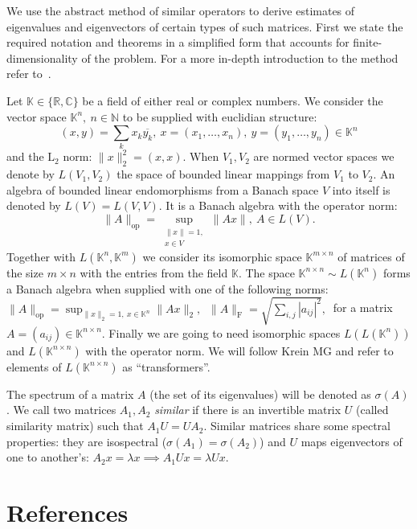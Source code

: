\documentclass[a4paper]{jpconf}
\begin{document}
We use the abstract method of similar operators
    to derive estimates of eigenvalues and eigenvectors
    of certain types of such matrices.
First we state the required notation and theorems
    in a simplified form that accounts for finite-dimensionality
    of the problem.
For a more in-depth introduction to the method
    refer to~\cite{baskakov1983methods,baskakov2014memory,baskakov2017method,baskakov2013completeness}.

Let \( \mathbb{K}\in \{ \mathbb{R}, \mathbb{C} \} \)
    be a field of either real or complex numbers.
We consider the vector space \( \mathbb{K}^n,\ n\in \mathbb{N} \)
    to be supplied with euclidian structure:
    \[
        (x, y){=}\sum_k x_k\overline{y_k},
        \ x{=}(x_1,\ldots, x_n),
        \ y=(y_1,\ldots, y_n)
        \in \mathbb{K}^n
        \]
    and the \( \mathrm{L}_2 \) norm:
    \(
        \|x\|_2^2{=}(x,x).
        \)
When \( V_1, V_2 \) are normed vector spaces
    we denote by \( L(V_1, V_2) \)
    the space of bounded linear mappings
    from \( V_1 \) to \( V_2 \).
An algebra of bounded linear endomorphisms
    from a Banach space \( V \)
    into itself
    is denoted by \( L(V) = L(V, V) \).
It is a Banach algebra with the operator norm:
    \[
        \|A\|_{\mathrm{op}} =
        \sup_{\substack{\|x\|=1,\\ x\in V}} \|A x\|,\ A\in L(V).
        \]
Together with \( L(\mathbb{K}^n, \mathbb{K}^m) \)
    we consider its isomorphic space \( \mathbb{K}^{m{\times}n} \)
    of matrices of the size \( m{\times}n \)
    with the entries from the field \( \mathbb{K} \).
The space \( \mathbb{K}^{n{\times}n}\sim L(\mathbb{K}^n) \)
    forms a Banach algebra
    when supplied with one of the following norms:
    \( \|A\|_{\mathrm{op}} = \sup_{\|x\|_2=1,\ x\in \mathbb{K}^n} \|A x\|_2,\ \)
    \( \|A\|_{\mathrm{F}} = \sqrt{\sum_{i,j} |a_{ij}|^2},\ \)
    for a matrix 
    \( A{=}(a_{ij})\in\mathbb{K}^{n\times n} \).
Finally we are going to need isomorphic spaces
    \( L(L(\mathbb{K}^n)) \) and \( L(\mathbb{K}^{n{\times}n}) \)
    with the operator norm.
We will follow {Krein MG}
    and refer to elements of \( L(\mathbb{K}^{n{\times}n}) \)
    as ``transformers''.

The spectrum of a matrix \( A \)
    (the set of its eigenvalues)
    will be denoted as \( \sigma(A) \).
We call two matrices \( A_1, A_2 \) \emph{similar}
    if there is an invertible matrix \( U \)
    (called similarity matrix)
    such that \( A_1 U = U A_2 \).
Similar matrices share some spectral properties:
    they are isospectral (\( \sigma(A_1) = \sigma(A_2) \))
    and \( U \) maps eigenvectors of one to another's:
    \( A_2 x = \lambda x \implies A_1 U x = \lambda U x \).
\section*{References}

{}
\end{document}
